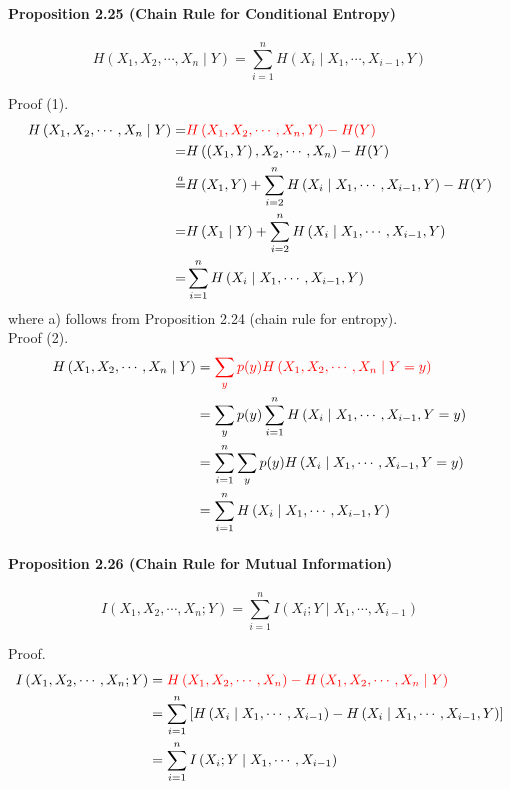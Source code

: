 \documentclass[8pt]{article}
\begin{document}
\begin{tcolorbox}
\paragraph{Proposition 2.25 (Chain Rule for Conditional Entropy)}
$$
H\left(X_{1}, X_{2}, \cdots, X_{n} \mid Y\right)=\sum_{i=1}^{n} H\left(X_{i} \mid X_{1}, \cdots, X_{i-1}, Y\right)
$$
\end{tcolorbox}
Proof (1).
$$
\begin{aligned}
H\left(X_{1}, X_{2}, \cdots, X_{n} \mid Y\right)
=& \color{red} H\left(X_{1}, X_{2}, \cdots, X_{n}, Y\right)-H(Y) \\
=& H\left(\left(X_{1}, Y\right), X_{2}, \cdots, X_{n}\right)-H(Y) \\
\stackrel{a}{=} & H\left(X_{1}, Y\right)+\sum_{i=2}^{n} H\left(X_{i} \mid X_{1}, \cdots, X_{i-1}, Y\right)-H(Y) \\
=&H\left(X_{1} \mid Y\right)+\sum_{i=2}^{n} H\left(X_{i} \mid X_{1}, \cdots, X_{i-1}, Y\right) \\
=&\sum_{i=1}^{n} H\left(X_{i} \mid X_{1}, \cdots, X_{i-1}, Y\right)
\end{aligned}
$$
where a) follows from Proposition 2.24 (chain rule for entropy). \\

Proof (2).
$$
\begin{aligned}
H \left(X_{1}, X_{2}, \cdots, X_{n} \mid Y\right)
&= \color{red} \sum_{y} p(y) H\left(X_{1}, X_{2}, \cdots, X_{n} \mid Y=y\right) \\
&=\sum_{y} p(y) \sum_{i=1}^{n} H\left(X_{i} \mid X_{1}, \cdots, X_{i-1}, Y=y\right) \\
&=\sum_{i=1}^{n} \sum_{y} p(y) H\left(X_{i} \mid X_{1}, \cdots, X_{i-1}, Y=y\right) \\
&=\sum_{i=1}^{n} H\left(X_{i} \mid X_{1}, \cdots, X_{i-1}, Y\right)
\end{aligned}
$$
\begin{tcolorbox}
\paragraph{Proposition 2.26 (Chain Rule for Mutual Information)}
$$
I\left(X_{1}, X_{2}, \cdots, X_{n} ; Y\right)=\sum_{i=1}^{n} I\left(X_{i} ; Y \mid X_{1}, \cdots, X_{i-1}\right)
$$
\end{tcolorbox}
Proof.
$$
\begin{aligned}
I\left(X_{1}, X_{2}, \cdots, X_{n} ; Y\right) 
&=\color{red} H\left(X_{1}, X_{2}, \cdots, X_{n}\right)-H\left(X_{1}, X_{2}, \cdots, X_{n} \mid Y\right) \\
&=\sum_{i=1}^{n}\left[H\left(X_{i} \mid X_{1}, \cdots, X_{i-1}\right)-H\left(X_{i} \mid X_{1}, \cdots, X_{i-1}, Y\right)\right] \\
&=\sum_{i=1}^{n} I\left(X_{i} ; Y \mid X_{1}, \cdots, X_{i-1}\right)
\end{aligned}
$$
\end{document}
